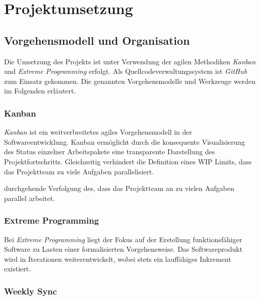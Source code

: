 \newpage

\section{Projektumsetzung}
\label{projektumsetzung}

\subsection{Vorgehensmodell und Organisation}
\label{Vorgehensmodelle_und_organisation}

Die Umsetzung des Projekts ist unter Verwendung der agilen Methodiken \emph{Kanban} und \emph{Extreme Programming} erfolgt. Als Quellcodeverwaltungssystem ist \emph{GitHub} zum Einsatz gekommen. Die genannten Vorgehensmodelle und Werkzeuge werden im Folgenden erläutert.

\subsubsection{Kanban}
\label{kanban}

\emph{Kanban} ist ein weitverbreitetes agiles Vorgehensmodell in der Softwareentwicklung. Kanban ermöglicht durch die konsequente Visualisierung des Status einzelner Arbeitspakete eine transparente Darstellung des Projektfortschritts. Gleichzeitig verhindert die Definition eines \ac{WIP} Limits, dass das Projektteam zu viele Aufgaben parallelisiert.


durchgehende Verfolgung des, dass das Projektteam an zu vielen Aufgaben parallel arbeitet.

\subsubsection{Extreme Programming}
\label{extreme_programming}

Bei \emph{Extreme Programming} liegt der Fokus auf der Erstellung funktionsfähiger Software zu Lasten einer formalisierten Vorgehensweise. Das Softwareprodukt wird in Iterationen weiterentwickelt, wobei stets ein lauffähiges Inkrement existiert.%

\subsubsection{Weekly Sync}
\label{weekly_sync}

